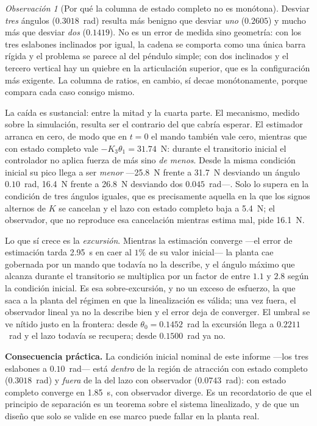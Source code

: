 \documentclass[11pt,letterpaper]{article}
\theoremstyle{definition}
\theoremstyle{plain}
\theoremstyle{remark}
\newtheorem{observacion}[definicion]{Observación}
\begin{document}
\begin{observacion}[Por qué la columna de estado completo no es monótona]
Desviar \emph{tres} ángulos ($0.3018$~rad) resulta más benigno que desviar
\emph{uno} ($0.2605$) y mucho más que desviar \emph{dos} ($0.1419$). No es un
error de medida sino geometría: con los tres eslabones inclinados por igual, la
cadena se comporta como una única barra rígida y el problema se parece al del
péndulo simple; con dos inclinados y el tercero vertical hay un quiebre en la
articulación superior, que es la configuración más exigente. La columna de
ratios, en cambio, sí decae monótonamente, porque compara cada caso consigo
mismo.
\end{observacion}

La caída es sustancial: entre la mitad y la cuarta parte. El mecanismo, medido
sobre la simulación, resulta ser el contrario del que cabría esperar. El
estimador arranca en cero, de modo que en $t=0$ el mando también vale cero,
mientras que con estado completo vale $-K_3\theta_1=31.74$~N: durante el
transitorio inicial el controlador no aplica fuerza de más sino \emph{de menos}.
Desde la misma condición inicial su pico llega a ser \emph{menor} ---25.8~N
frente a 31.7~N desviando un ángulo $0.10$~rad, 16.4~N frente a 26.8~N desviando
dos $0.045$~rad---. Solo lo supera en la condición de tres ángulos iguales, que
es precisamente aquella en la que los signos alternos de $K$ se cancelan y el
lazo con estado completo baja a 5.4~N; el observador, que no reproduce esa
cancelación mientras estima mal, pide 16.1~N.

Lo que sí crece es la \emph{excursión}. Mientras la estimación converge ---el
error de estimación tarda 2.95~s en caer al $1\%$ de su valor inicial--- la
planta cae gobernada por un mando que todavía no la describe, y el ángulo máximo
que alcanza durante el transitorio se multiplica por un factor de entre $1.1$ y
$2.8$ según la condición inicial. Es esa sobre-excursión, y no un exceso de
esfuerzo, la que saca a la planta del régimen en que la linealización es válida;
una vez fuera, el observador lineal ya no la describe bien y el error deja de
converger. El umbral se ve nítido justo en la frontera: desde
$\theta_0=0.1452$~rad la excursión llega a $0.2211$~rad y el lazo todavía se
recupera; desde $0.1500$~rad ya no.

\begin{alerta}
\small
\textbf{Consecuencia práctica.} La condición inicial nominal de este informe
---los tres eslabones a $0.10$~rad--- está \emph{dentro} de la región de
atracción con estado completo ($0.3018$~rad) y \emph{fuera} de la del lazo con
observador ($0.0743$~rad): con estado completo converge en 1.85~s, con
observador diverge. Es un recordatorio de que el principio de separación es un
teorema sobre el sistema linealizado, y de que un diseño que solo se valide en
ese marco puede fallar en la planta real.
\end{alerta}
\end{document}
